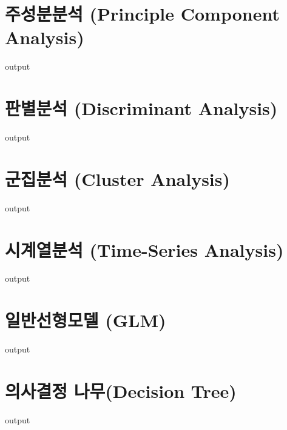 \documentclass{book}
\begin{document}
\section{주성분분석 (Principle Component Analysis)}
\begin{Schunk}
\begin{Soutput}
output
\end{Soutput}
\end{Schunk}

\section{판별분석 (Discriminant Analysis) }
\begin{Schunk}
\begin{Soutput}
output
\end{Soutput}
\end{Schunk}

\section{군집분석 (Cluster Analysis) }
\begin{Schunk}
\begin{Soutput}
output
\end{Soutput}
\end{Schunk}

\section{시계열분석 (Time-Series Analysis) }
\begin{Schunk}
\begin{Soutput}
output
\end{Soutput}
\end{Schunk}

\section{일반선형모델 (GLM)}
\begin{Schunk}
\begin{Soutput}
output
\end{Soutput}
\end{Schunk}

\section{의사결정 나무(Decision Tree)}
\begin{Schunk}
\begin{Soutput}
output
\end{Soutput}
\end{Schunk}
\end{document}
